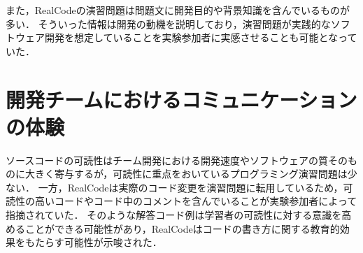 また，RealCodeの演習問題は問題文に開発目的や背景知識を含んでいるものが多い．
そういった情報は開発の動機を説明しており，演習問題が実践的なソフトウェア開発を想定していることを実験参加者に実感させることも可能となっていた．





\section{開発チームにおけるコミュニケーションの体験}


ソースコードの可読性はチーム開発における開発速度やソフトウェアの質そのものに大きく寄与するが，可読性に重点をおいているプログラミング演習問題は少ない．
一方，RealCodeは実際のコード変更を演習問題に転用しているため，可読性の高いコードやコード中のコメントを含んでいることが実験参加者によって指摘されていた．
そのような解答コード例は学習者の可読性に対する意識を高めることができる可能性があり，RealCodeはコードの書き方に関する教育的効果をもたらす可能性が示唆された．




